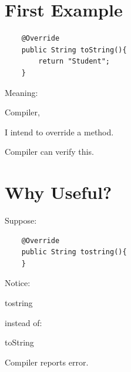 \documentclass[11pt,a4paper]{book}
\begin{document}


\section{First Example}

\begin{verbatim} 
    @Override
    public String toString(){
        return "Student";
    }
\end{verbatim}


Meaning:


Compiler,

I intend to override a method.


Compiler can verify this.


\section{Why Useful?}

Suppose:

\begin{verbatim} 
    @Override
    public String tostring(){
    }
\end{verbatim}


Notice:


tostring


instead of:


toString


Compiler reports error.
\end{document}

